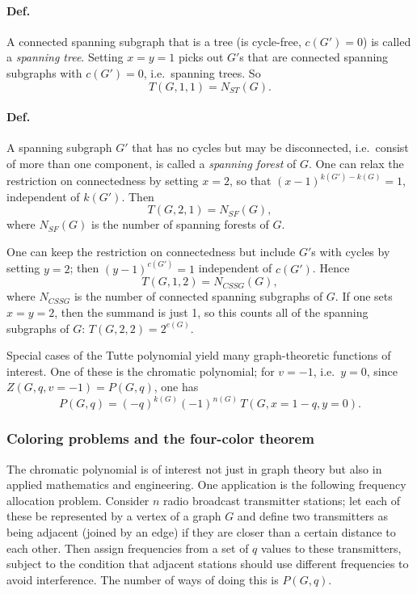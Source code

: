 \paragraph{Def.} A connected spanning subgraph that is a tree (is cycle-free, $c(G') = 0$) is called a \emph{spanning tree}.
Setting $x = y = 1$ picks out $G'$s that are connected spanning subgraphs with $c(G') = 0$, i.e.\ spanning trees. So
\begin{equation}
  T(G,1,1) = N_{ST}(G).
\end{equation}

\paragraph{Def.} A spanning subgraph $G'$ that has no cycles but may be disconnected, i.e.\ consist of more than one component,
is called a \emph{spanning forest} of $G$. One can relax the restriction on connectedness by setting $x = 2$, so that
$(x-1)^{k(G')-k(G)} = 1$, independent of $k(G')$. Then
\begin{equation}
  T(G,2,1) = N_{SF}(G),
\end{equation}
where $N_{SF}(G)$ is the number of spanning forests of $G$.

One can keep the restriction on connectedness but include $G'$s with cycles by setting $y = 2$; then $(y-1)^{c(G')} = 1$
independent of $c(G')$. Hence
\begin{equation}
  T(G,1,2) = N_{CSSG}(G),
\end{equation}
where $N_{CSSG}$ is the number of connected spanning subgraphs of $G$. If one sets $x = y = 2$, then the summand is just 1, so
this counts all of the spanning subgraphs of $G$: $T(G,2,2) = 2^{e(G)}$.

Special cases of the Tutte polynomial yield many graph-theoretic functions of interest. One of these is the chromatic
polynomial; for $v = -1$, i.e.\ $y = 0$, since $Z(G,q,v=-1) = P(G,q)$, one has
\begin{equation}
  P(G,q) = (-q)^{k(G)}(-1)^{n(G)}\,T(G,x=1-q,y=0).
\end{equation}

\subsubsection*{Coloring problems and the four-color theorem}

The chromatic polynomial is of interest not just in graph theory but also in applied mathematics and engineering. One
application is the following frequency allocation problem. Consider $n$ radio broadcast transmitter stations; let each of these
be represented by a vertex of a graph $G$ and define two transmitters as being adjacent (joined by an edge) if they are closer
than a certain distance to each other. Then assign frequencies from a set of $q$ values to these transmitters, subject to the
condition that adjacent stations should use different frequencies to avoid interference. The number of ways of doing this is
$P(G,q)$.

